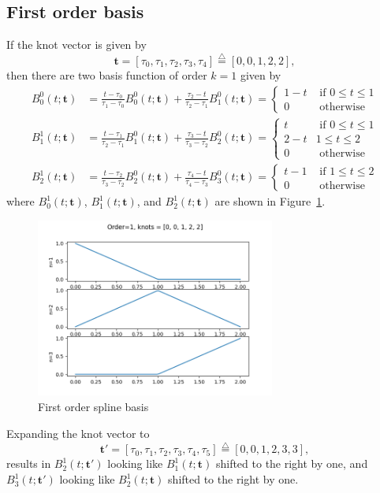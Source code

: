 \documentclass{article}
\newcommand{\defeq}{\stackrel{\triangle}{=}}
\begin{document}
\clearpage


\subsection{First order basis}

If the knot vector is given by
\[
\mathbf{t} = [\tau_0, \tau_1, \tau_2, \tau_3, \tau_4] \defeq [0, 0, 1, 2, 2],
\]
then there are two basis function of order $k=1$ given by
\begin{align*}
B_0^0(t; \mathbf{t}) &= \frac{t-\tau_0}{\tau_1-\tau_0} B_0^0(t;\mathbf{t}) + \frac{\tau_2-t}{\tau_2-\tau_1}B_1^0(t; \mathbf{t}) 
	= \begin{cases} 1-t & \text{~if~} 0 \leq t \leq 1 \\ 
 					0   & \text{~otherwise} 
 	  \end{cases}
\\ 
B_1^1(t; \mathbf{t}) &= \frac{t-\tau_1}{\tau_2-\tau_1} B_1^0(t;\mathbf{t}) + \frac{\tau_3-t}{\tau_3-\tau_2}B_2^0(t; \mathbf{t})
	= \begin{cases} t & \text{~if~} 0 \leq t \leq 1 \\ 
 									2-t & 1 \leq t \leq 2 \\
 									0 & \text{~otherwise}
 					    \end{cases}
\\ 
B_2^1(t; \mathbf{t}) &= \frac{t-\tau_2}{\tau_3-\tau_2} B_2^0(t;\mathbf{t}) + \frac{\tau_4-t}{\tau_4-\tau_3}B_3^0(t; \mathbf{t})
	= \begin{cases} t-1 & \text{~if~} 1 \leq t \leq 2 \\ 
 					0 & \text{~otherwise}
 	  \end{cases}
\end{align*}
where $B_0^1(t; \mathbf{t})$, $B_1^1(t; \mathbf{t})$, and $B_2^1(t; \mathbf{t})$ are shown in Figure~\ref{fig:spline_basis_1}.
\begin{figure}[hbt]
  \centering\includegraphics[width=0.7\textwidth]{./figures/spline_basis_1}
  \caption{First order spline basis}
  \label{fig:spline_basis_1}  
\end{figure}
Expanding the knot vector to 
\[
\mathbf{t}' = [\tau_0, \tau_1, \tau_2, \tau_3, \tau_4, \tau_5] \defeq [0, 0, 1, 2, 3, 3],
\]
results in $B_2^1(t; \mathbf{t}')$ looking like $B_1^1(t; \mathbf{t})$ shifted to the right by one, and $B_3^1(t; \mathbf{t}')$ looking like $B_2^1(t; \mathbf{t})$ shifted to the right by one.
\end{document}
